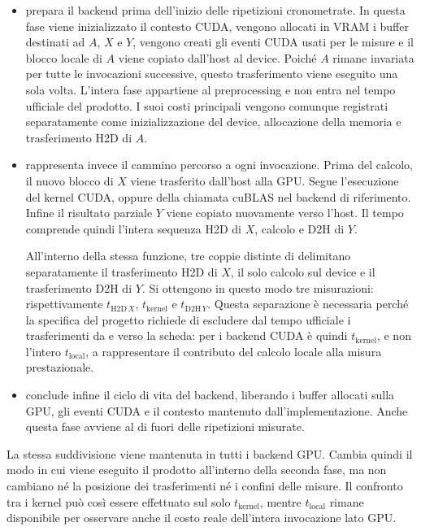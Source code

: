 \begin{itemize}
    \item \textbf{} prepara il backend prima dell'inizio
    delle ripetizioni cronometrate. In questa fase viene inizializzato il
    contesto CUDA, vengono allocati in VRAM i buffer destinati ad $A$, $X$
    e $Y$, vengono creati gli eventi CUDA usati per le misure e il blocco
    locale di $A$ viene copiato dall'host al device. Poiché $A$ rimane
    invariata per tutte le invocazioni successive, questo trasferimento
    viene eseguito una sola volta. L'intera fase appartiene al
    preprocessing e non entra nel tempo ufficiale del prodotto. I suoi
    costi principali vengono comunque registrati separatamente come
    inizializzazione del device, allocazione della memoria e trasferimento
    H2D di $A$.

    \item \textbf{} rappresenta invece il cammino percorso a ogni
    invocazione. Prima del calcolo, il nuovo blocco di $X$ viene trasferito
    dall'host alla GPU. Segue l'esecuzione del kernel CUDA, oppure della
    chiamata cuBLAS nel backend di riferimento. Infine il risultato
    parziale $Y$ viene copiato nuovamente verso l'host. Il tempo
     comprende quindi l'intera sequenza
    H2D di $X$, calcolo e D2H di $Y$.

    All'interno della stessa funzione, tre coppie distinte di
     delimitano separatamente il trasferimento H2D di $X$,
    il solo calcolo sul device e il trasferimento D2H di $Y$. Si ottengono
    in questo modo tre misurazioni: rispettivamente $t_{\mathrm{H2D}\,X}$,
    $t_{\mathrm{kernel}}$ e $t_{\mathrm{D2H}\,Y}$.
    Questa separazione è necessaria perché la specifica del progetto
    richiede di escludere dal tempo ufficiale i trasferimenti da e verso
    la scheda: per i backend CUDA è quindi $t_{\mathrm{kernel}}$, e non
    l'intero $t_{\mathrm{local}}$, a rappresentare il contributo del
    calcolo locale alla misura prestazionale.

    \item \textbf{} conclude infine il ciclo di vita del
    backend, liberando i buffer allocati sulla GPU, gli eventi CUDA e il
    contesto mantenuto dall'implementazione. Anche questa fase avviene al
    di fuori delle ripetizioni misurate.
\end{itemize}

La stessa suddivisione viene mantenuta in tutti i backend GPU. Cambia quindi
il modo in cui viene eseguito il prodotto all'interno della seconda fase,
ma non cambiano né la posizione dei trasferimenti né i confini delle misure.
Il confronto tra i kernel può così essere effettuato sul solo
$t_{\mathrm{kernel}}$, mentre $t_{\mathrm{local}}$ rimane disponibile per
osservare anche il costo reale dell'intera invocazione lato GPU.

